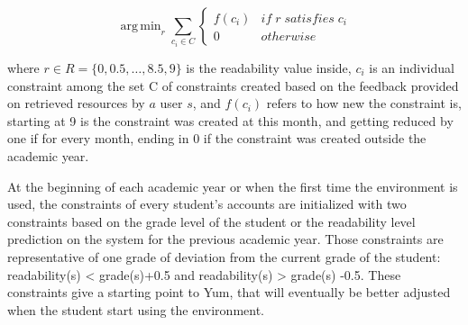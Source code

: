\documentclass{sig-alternate-05-2015}
\DeclareMathOperator*{\argminA}{arg\,min} %
\begin{document}
\begin{equation}
\argminA_r  \sum_ {c_{i} \in C} \begin{cases}f(c_{i}) & if \; r \;  satisfies \; c_{i}\\0 & otherwise\end{cases}  
\label{formula:tracking}
\end{equation}





where $r \in R=\{0,0.5,\dotsc ,8.5,9\}$ is the readability value inside, $c_i$ is an individual constraint among the set C of constraints created based on the feedback provided on retrieved resources by $a$ user $s$, and $f(c_i)$ refers to how new the constraint is, starting at 9 is the constraint was created at this month, and getting reduced by one if for every month, ending in 0 if the constraint was created outside the academic year.


At the beginning of each academic year or when the first time the environment is used, the constraints of every student's accounts are initialized with two constraints based on the grade level of the student or the readability level prediction on the system for the previous academic year. Those constraints are representative of one grade of deviation from the current grade of the student: readability(s) < grade(s)+0.5 and readability(s) > grade(s) -0.5. These constraints give a starting point to Yum, that will eventually be better adjusted when the student start using the environment. 
\end{document}
